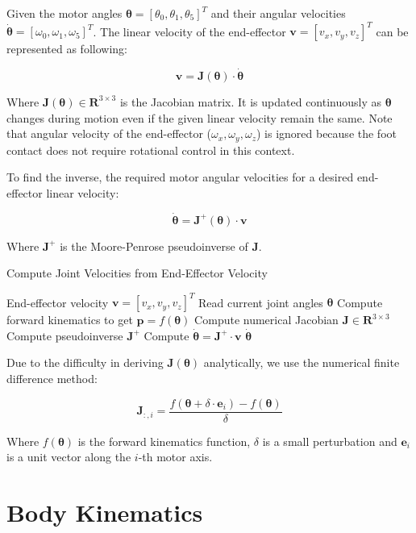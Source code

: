 \documentclass[a4paper,11pt]{article}
\begin{document}
Given the motor angles $\boldsymbol{\theta} = [\theta_0, \theta_1, \theta_5]^T$ and their angular velocities $\dot{\boldsymbol{\theta}} = [\omega_0, \omega_1, \omega_5]^T$. 
The linear velocity of the end-effector $\mathbf{v} = [v_x, v_y, v_z]^T$ can be represented as following:

$$
\mathbf{v} = \mathbf{J}(\boldsymbol{\theta}) \cdot \dot{\boldsymbol{\theta}}
$$

Where $\mathbf{J}(\boldsymbol{\theta}) \in \mathbf{R}^{3 \times 3}$ is the Jacobian matrix. It is updated continuously as $\boldsymbol{\theta}$ 
changes during motion even if the given linear velocity remain the same.
Note that angular velocity of the end-effector ($\omega_x, \omega_y, \omega_z$) is ignored because the foot contact does not require rotational control in this context.

To find the inverse, the required motor angular velocities for a desired end-effector linear velocity:

$$
\dot{\boldsymbol{\theta}} = \mathbf{J}^{+}(\boldsymbol{\theta}) \cdot \mathbf{v}
$$

Where $\mathbf{J}^+$ is the Moore-Penrose pseudoinverse of $\mathbf{J}$.

\begin{algorithm}[H]
	\caption{Compute Joint Velocities from End-Effector Velocity}
	\begin{algorithmic}[1]
		\Require End-effector velocity $\mathbf{v} = [v_x, v_y, v_z]^T$
		\State Read current joint angles $\boldsymbol{\theta}$
		\State Compute forward kinematics to get $\mathbf{p} = f(\boldsymbol{\theta})$
		\State Compute numerical Jacobian $\mathbf{J} \in \mathbf{R}^{3 \times 3}$
		\State Compute pseudoinverse $\mathbf{J}^{+}$
		\State Compute $\dot{\boldsymbol{\theta}} = \mathbf{J}^{+} \cdot \mathbf{v}$
		\State \Return $\dot{\boldsymbol{\theta}}$
	\end{algorithmic}
\end{algorithm}

Due to the difficulty in deriving $\mathbf{J}(\boldsymbol{\theta})$ analytically, we use the numerical finite difference method:

$$
\mathbf{J}_{:,i} = \frac{f(\boldsymbol{\theta} + \delta \cdot \mathbf{e}_i) - f(\boldsymbol{\theta})}{\delta}
$$

Where $f(\boldsymbol{\theta})$ is the forward kinematics function, $\delta$ is a small perturbation and 
$\mathbf{e}_i$ is a unit vector along the $i$-th motor axis.

\section*{Body Kinematics}
\end{document}
